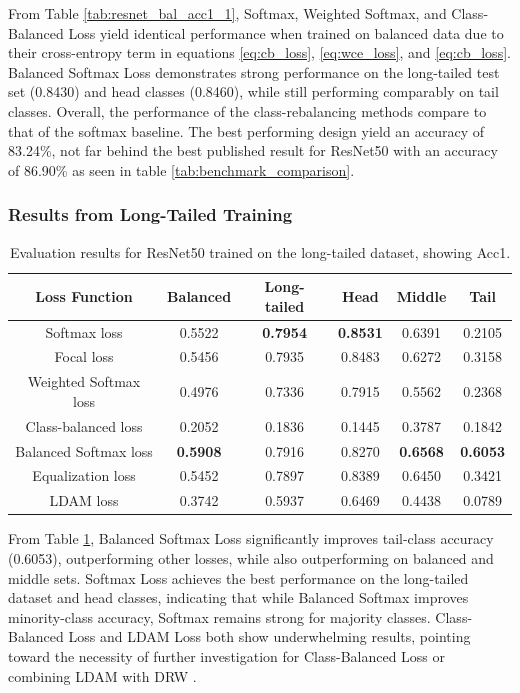 From Table \ref{tab:resnet_bal_acc1_1}, Softmax, Weighted Softmax, and Class-Balanced Loss yield identical performance when trained on balanced data due to their cross-entropy term in equations \eqref{eq:cb_loss}, \eqref{eq:wce_loss}, and \eqref{eq:cb_loss}. Balanced Softmax Loss demonstrates strong performance on the long-tailed test set (0.8430) and head classes (0.8460), while still performing comparably on tail classes. Overall, the performance of the class-rebalancing methods compare to that of the softmax baseline. The best performing design yield an accuracy of 83.24\%, not far behind the best published result for ResNet50 with an accuracy of 86.90\% as seen in table \ref{tab:benchmark_comparison}.

\subsubsection{Results from Long-Tailed Training}

\begin{table}[H]
    \centering
    \caption{Evaluation results for ResNet50 trained on the long-tailed dataset, showing Acc1.}
    \begin{tabular}{cccccc}
        \toprule
        Loss Function & Balanced & Long-tailed & Head & Middle & Tail \\ 
        \midrule
        Softmax loss   & 0.5522 & \textbf{0.7954} & \textbf{0.8531} & 0.6391 & 0.2105 \\
        Focal loss   & 0.5456 & 0.7935 & 0.8483 & 0.6272 & 0.3158 \\
        Weighted Softmax loss   & 0.4976 & 0.7336 & 0.7915 & 0.5562 & 0.2368 \\
        Class-balanced loss   & 0.2052 & 0.1836 &  0.1445 & 0.3787 & 0.1842 \\
        Balanced Softmax loss   & \textbf{0.5908} & 0.7916 & 0.8270 & \textbf{0.6568} & \textbf{0.6053} \\
        Equalization loss   & 0.5452 & 0.7897 & 0.8389 & 0.6450 & 0.3421 \\
        LDAM loss   & 0.3742 & 0.5937 & 0.6469 & 0.4438 & 0.0789 \\
        \bottomrule
    \end{tabular}
    \label{tab:resnet_lt_acc1_1}
\end{table}

From Table \ref{tab:resnet_lt_acc1_1}, Balanced Softmax Loss significantly improves tail-class accuracy (0.6053), outperforming other losses, while also outperforming on balanced and middle sets. Softmax Loss achieves the best performance on the long-tailed dataset and head classes, indicating that while Balanced Softmax improves minority-class accuracy, Softmax remains strong for majority classes. Class-Balanced Loss and LDAM Loss both show underwhelming results, pointing toward the necessity of further investigation for Class-Balanced Loss  or combining LDAM with DRW \cite{cao2019learningimbalanceddatasetslabeldistributionaware}. 

